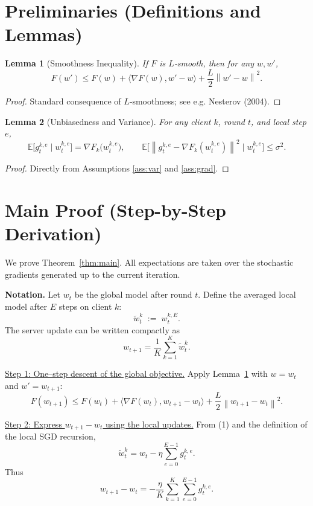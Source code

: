 \documentclass{article}
\newtheorem{lemma}{Lemma}
\newcommand{\E}{\mathbb{E}}
\newcommand{\norm}[1]{\left\|#1\right\|}
\begin{document}
\newpage
\section*{Preliminaries (Definitions and Lemmas)}
\begin{lemma}[Smoothness Inequality]\label{lem:smooth}
If $F$ is $L$‑smooth, then for any $w,w'$,
\[
F(w')\le F(w)+\langle\nabla F(w),w'-w\rangle+\frac{L}{2}\norm{w'-w}^2 .
\]
\end{lemma}
\begin{proof}
Standard consequence of $L$‑smoothness; see e.g. Nesterov (2004). \qedhere
\end{proof}

\begin{lemma}[Unbiasedness and Variance]\label{lem:unbiased}
For any client $k$, round $t$, and local step $e$,
\[
\E\!\bigl[g_{t}^{k,e}\mid w_{t}^{k,e}\bigr]=\nabla F_k\!\bigl(w_{t}^{k,e}\bigr),\qquad
\E\!\bigl[\norm{g_{t}^{k,e}-\nabla F_k(w_{t}^{k,e})}^2\mid w_{t}^{k,e}\bigr]\le\sigma^2 .
\]
\end{lemma}
\begin{proof}
Directly from Assumptions \ref{ass:var} and \ref{ass:grad}. \qedhere
\end{proof}

\section*{Main Proof (Step-by-Step Derivation)}
We prove Theorem~\ref{thm:main}.  
All expectations are taken over the stochastic gradients generated up to the current iteration.

\noindent\textbf{Notation.}  
Let $w_t$ be the global model after round $t$.  
Define the averaged local model after $E$ steps on client $k$:
\[
\tilde w_{t}^{k}\;:=\; w_{t}^{k,E}.
\]
The server update can be written compactly as
\[
w_{t+1}= \frac1K\sum_{k=1}^K \tilde w_{t}^{k}.
\tag{1}
\]

\noindent\underline{Step 1: One–step descent of the global objective.}  
Apply Lemma~\ref{lem:smooth} with $w=w_t$ and $w'=w_{t+1}$:
\[
F(w_{t+1})\le F(w_t)+\langle\nabla F(w_t),w_{t+1}-w_t\rangle
+\frac{L}{2}\norm{w_{t+1}-w_t}^2 .
\tag{2}
\]

\noindent\underline{Step 2: Express $w_{t+1}-w_t$ using the local updates.}  
From (1) and the definition of the local SGD recursion,
\[
\tilde w_{t}^{k}= w_t-\eta\sum_{e=0}^{E-1} g_{t}^{k,e}.
\]
Thus
\[
w_{t+1}-w_t=
-\frac{\eta}{K}\sum_{k=1}^K\sum_{e=0}^{E-1} g_{t}^{k,e}.
\tag{3}
\]
\end{document}

